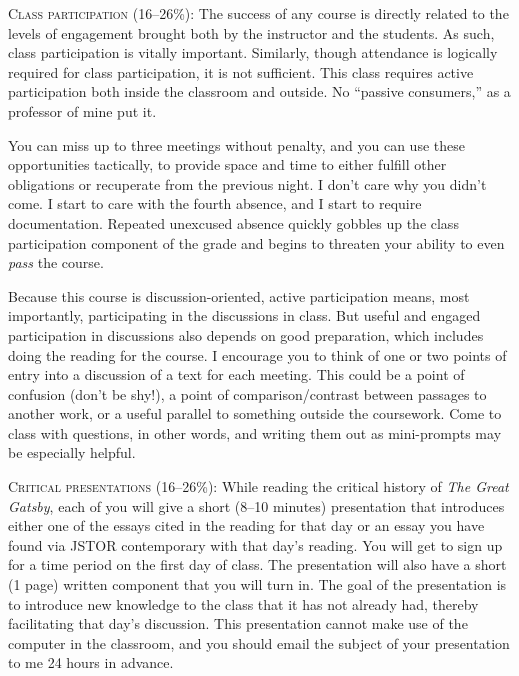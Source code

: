 \begin{description}

  \item \textsc{Class participation (16–26\%):} The success of any course is
    directly related to the levels of engagement brought both by the instructor
    and the students. As such, class participation is vitally important.
    Similarly, though attendance is logically required for class participation,
    it is not sufficient. This class requires active participation both inside
    the classroom and outside. No “passive consumers,” as a professor of mine
    put it. 
    
    You can miss up to three meetings without penalty, and you can use these
    opportunities tactically, to provide space and time to either fulfill
    other obligations or recuperate from the previous night. I don’t care why
    you didn’t come. I start to care with the fourth absence, and I start to
    require documentation. Repeated unexcused absence quickly gobbles up the
    class participation component of the grade and begins to threaten your
    ability to even \textit{pass} the course.

    Because this course is discussion-oriented, active participation means,
    most importantly, participating in the discussions in class. But useful and
    engaged participation in discussions also depends on good preparation,
    which includes doing the reading for the course. I encourage you to think
    of one or two points of entry into a discussion of a text for each meeting.
    This could be a point of confusion (don’t be shy!), a point of
    comparison/contrast between passages to another work, or a useful parallel
    to something outside the coursework. Come to class with questions, in other
    words, and writing them out as mini-prompts may be especially helpful.

  \item \textsc{Critical presentations (16–26\%):} While reading the critical
    history of \textit{The Great Gatsby}, each of you will give a short (8–10
    minutes) presentation that introduces either one of the essays cited in the
    reading for that day or an essay you have found via JSTOR contemporary with
    that day’s reading. You will get to sign up for a time period on the first
    day of class. The presentation will also have a short (1 page) written
    component that you will turn in. The goal of the presentation is to
    introduce new knowledge to the class that it has not already had, thereby
    facilitating that day’s discussion. This presentation cannot make use of
    the computer in the classroom, and you should email the subject of your
    presentation to me 24 hours in advance.


\end{description}
